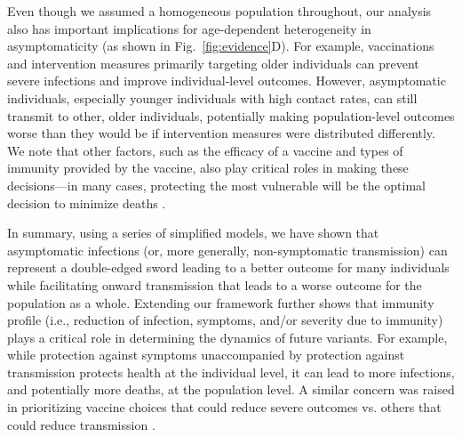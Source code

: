 \documentclass[12pt]{article}
\newcommand{\fref}[1]{Fig.~\ref{fig:#1}}
\begin{document}
Even though we assumed a homogeneous population throughout, our analysis also has important implications for age-dependent heterogeneity in asymptomaticity (as shown in \fref{evidence}D).
For example, vaccinations and intervention measures primarily targeting older individuals can prevent severe infections and improve individual-level outcomes.
However, asymptomatic individuals, especially younger individuals with high contact rates, can still transmit to other, older individuals, potentially making population-level outcomes worse than they would be if intervention measures were distributed differently.
We note that other factors, such as the efficacy of a vaccine and types of immunity provided by the vaccine, also play critical roles in making these decisions---in many cases, protecting the most vulnerable will be the optimal decision to minimize deaths \citep{moore2021modelling}.

In summary, using a series of simplified models, we have shown that asymptomatic infections (or, more generally, non-symptomatic transmission) can represent a double-edged sword leading to a better outcome for many individuals while facilitating onward transmission that leads to a worse outcome for the population as a whole.
Extending our framework further shows that immunity profile (i.e., reduction of infection, symptoms, and/or severity due to immunity) plays a critical role in determining the dynamics of future variants. 
For example, while protection against symptoms unaccompanied by protection against transmission protects health at the individual level, it can lead to more infections, and potentially more deaths, at the population level.
A similar concern was raised in prioritizing vaccine choices that could reduce severe outcomes vs. others that could reduce transmission \citep{koelle2022changing}.
\end{document}
